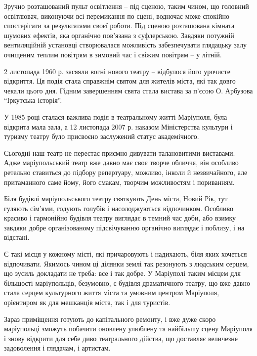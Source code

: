 Зручно розташований пульт освітлення – під сценою, таким чином, що головний
освітлювач, виконуючи всі перемикання по сцені, водночас може спокійно
спостерігати за результатами своєї роботи. Під сценою розташована кімната
шумових ефектів, яка органічно пов'язана з суфлерською. Завдяки потужній
вентиляційній установці створювалася можливість забезпечувати глядацьку залу
очищеним теплим повітрям в зимовий час і свіжим повітрям – у літній.


2 листопада 1960 р. засяяли вогні нового театру – відбулося його урочисте
відкриття. Ця подія стала справжнім святом для жителів міста, які так довго
чекали цього дня. Гідним завершенням свята стала вистава за п'єсою О. Арбузова
\enquote{Іркутська історія}.

У 1985 році сталася важлива подія в театральному житті Маріуполя, була відкрита
мала зала, а 12 листопада 2007 р. наказом Міністерства культури і туризму
театру було присвоєно заслужений статус академічного.

Сьогодні наш театр не перестає приємно дивувати талановитими виставами. Адже
маріупольський театр вже давно має своє творче обличчя, він особливо ретельно
ставиться до підбору репертуару, можливо, інколи й незвичайного, але
притаманного саме йому, його смакам, творчим можливостям і пориванням.

Біля будівлі маріупольського театру святкують День міста, Новий Рік, тут
гуляють сім'ями, годують голубів і насолоджуються відпочинком. Особливо красиво
і гармонійно будівля театру виглядає в темний час доби, або взимку завдяки
добре організованому підсвічуванню органічно виглядає і поблизу, і на відстані.

Є такі місця у кожному місті, які причаровують і надихають, біля яких хочеться
відпочивати. Якимось чином ці ділянки землі так резонують з людським серцем, що
зусиль докладати не треба: все і так добре. У Маріуполі таким місцем для
більшості маріупольців, безумовно, є будівля драматичного театру, що вже давно
стала серцем культурного життя міста та умовним центром Маріуполя, орієнтиром
як для мешканців міста, так і для туристів.

Зараз приміщення готують до капітального ремонту, і вже дуже скоро маріупольці
зможуть побачити оновлену улюблену та найбільшу сцену Маріуполя і знову
відкрити для себе диво театрального дійства, що доставляє величезне задоволення
і глядачам, і артистам.



